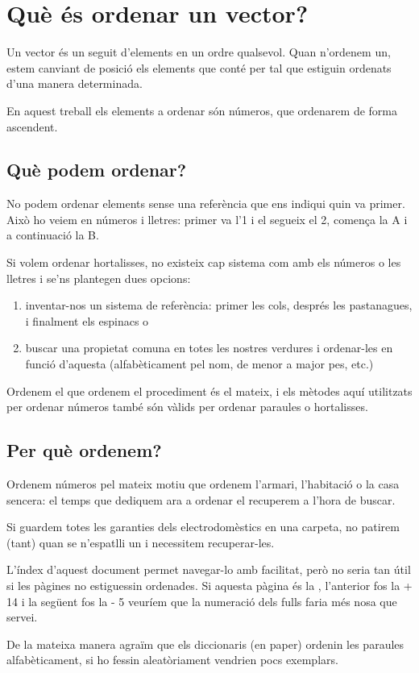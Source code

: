\chapter{Què és ordenar un vector?}
Un vector és un seguit d'elements en un ordre qualsevol.
Quan n'ordenem un, estem canviant de posició els elements que conté per tal que estiguin ordenats d'una manera determinada.

En aquest treball els elements a ordenar són números, que ordenarem de forma ascendent.

\section{Què podem ordenar?}
No podem ordenar elements sense una referència que ens indiqui quin va primer.
Això ho veiem en números i lletres: primer va l'1 i el segueix el 2, comença la A i a continuació la B.

Si volem ordenar hortalisses, no existeix cap sistema com amb els números o les lletres i se'ns plantegen dues opcions:
\begin{enumerate}[label={\alph*)}]
	\item inventar-nos un sistema de referència: primer les cols, després les pastanagues, i finalment els espinacs o
	\item buscar una propietat comuna en totes les nostres verdures i ordenar-les en funció d'aquesta (alfabèticament pel nom, de menor a major pes, etc.)
\end{enumerate}

Ordenem el que ordenem el procediment és el mateix, i els mètodes aquí utilitzats per ordenar números també són vàlids per ordenar paraules o hortalisses.

\pagebreak
\section{Per què ordenem?}
Ordenem números pel mateix motiu que ordenem l'armari, l'habitació o la casa sencera: el temps que dediquem ara a ordenar el recuperem a l'hora de buscar.

Si guardem totes les garanties dels electrodomèstics en una carpeta, no patirem (tant) quan se n'espatlli un i necessitem recuperar-les.

L'índex d'aquest document permet navegar-lo amb facilitat, però no seria tan útil si les pàgines no estiguessin ordenades. Si aquesta pàgina és la {\thepage}, l'anterior fos la {\the\numexpr \thepage + 14} i la següent fos la {\the\numexpr \thepage - 5} veuríem que la numeració dels fulls faria més nosa que servei.

De la mateixa manera agraïm que els diccionaris (en paper) ordenin les paraules alfabèticament, si ho fessin aleatòriament vendrien pocs exemplars.